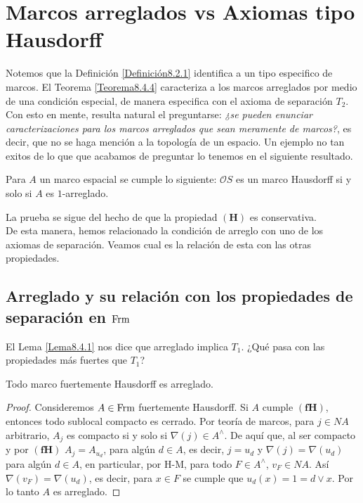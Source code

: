 \chapter{Marcos arreglados vs Axiomas tipo Hausdorff}\label{Relación MA y AH}

Notemos que la Definición \ref{Definición8.2.1} identifica a un tipo especifico de marcos. El Teorema \ref{Teorema8.4.4} caracteriza a los marcos arreglados por medio de una condición especial, de manera especifica con el axioma de separación $T_2$.
Con esto en mente, resulta natural el preguntarse: \emph{¿se pueden enunciar caracterizaciones para los marcos arreglados que sean meramente de marcos?}, es decir, que no se haga mención a la topología de un espacio. Un ejemplo no tan exitos de lo que 
que acabamos de preguntar lo tenemos en el siguiente resultado.

\begin{cor}\label{TadyHausdorff}
Para $A$ un marco espacial se cumple lo siguiente: $\mathcal{O}S$ es un marco Hausdorff si y solo si $A$ es $1$-arreglado. 
\end{cor}
La prueba se sigue del hecho de que la propiedad $\mathbf{(H)}$ es conservativa.\\

De esta manera, hemos relacionado la condición de arreglo con uno de los axiomas de separación. Veamos cual es la relación de esta con las otras propiedades.\\

\section{Arreglado y su relación con los propiedades de separación en $\mathrm{Frm}$}

El Lema \ref{Lema8.4.1} nos dice que arreglado implica $T_1$. ¿Qué pasa con las propiedades más fuertes que $T_1$?

\begin{lem}\label{TadyFHausdorff}
    Todo marco fuertemente Hausdorff es arreglado.
\end{lem}

\begin{proof}
    Consideremos $A\in \mathrm{Frm}$ fuertemente Hausdorff. Si $A$ cumple $\mathbf{(fH)}$, entonces todo sublocal compacto es cerrado. Por teoría de marcos, para $j\in NA$ arbitrario, $A_j$ es compacto si y solo si $\nabla(j)\in A^\wedge$. De aquí que, al ser compacto y por $\mathbf{(fH)}$ $A_j=A_{u_d}$, para algún $d\in A$, es decir, $j=u_d$ y $\nabla(j)=\nabla(u_d)$ para algún $d\in A$, en particular, por H-M, para todo $F\in A^\wedge$, $v_F\in NA$. Así $\nabla(v_F)=\nabla(u_d)$, es decir, para $x\in F$ se cumple que $u_d(x)=1=d\vee x$. Por lo tanto $A$ es arreglado.
\end{proof}

